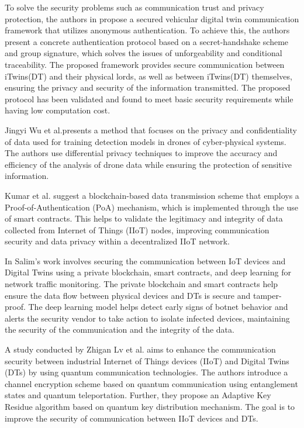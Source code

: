 To solve the security problems such as communication trust and privacy protection, the authors in\cite{xuEfficientAuthenticationVehicular2021} propose a secured vehicular digital twin communication framework that utilizes anonymous authentication. To achieve this, the authors present a concrete authentication protocol based on a secret-handshake scheme and group signature, which solves the issues of unforgeability and conditional traceability. The proposed framework provides secure communication between iTwins(DT) and their physical lords, as well as between iTwins(DT) themselves, ensuring the privacy and security of the information transmitted. The proposed protocol has been validated and found to meet basic security requirements while having low computation cost.  

Jingyi Wu et al.\cite{wuDeepLearningDriven2022}presents a method that focuses on the privacy and confidentiality of data used for training detection models in drones of cyber-physical systems. The authors use differential privacy techniques to improve the accuracy and efficiency of the analysis of drone data while ensuring the protection of sensitive information. 

Kumar et al.\cite{kumarBlockchainDeepLearning2022} suggest a blockchain-based data transmission scheme that employs a Proof-of-Authentication (PoA) mechanism, which is implemented through the use of smart contracts. This helps to validate the legitimacy and integrity of data collected from Internet of Things (IIoT) nodes, improving communication security and data privacy within a decentralized IIoT network.  

In \cite{salimBlockchainEnabledSecureDigital2022} Salim's work involves securing the communication between IoT devices and Digital Twins using a private blockchain, smart contracts, and deep learning for network traffic monitoring. The private blockchain and smart contracts help ensure the data flow between physical devices and DTs is secure and tamper-proof. The deep learning model helps detect early signs of botnet behavior and alerts the security vendor to take action to isolate infected devices, maintaining the security of the communication and the integrity of the data.  


A study conducted by Zhigan Lv et al.\cite{lvDigitalTwinsBased2022} aims to enhance the communication security between industrial Internet of Things devices (IIoT) and Digital Twins (DTs) by using quantum communication technologies. The authors introduce a channel encryption scheme based on quantum communication using entanglement states and quantum teleportation. Further, they propose an Adaptive Key Residue algorithm based on quantum key distribution mechanism. The goal is to improve the security of communication between IIoT devices and DTs.

